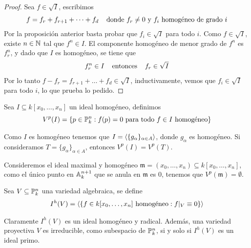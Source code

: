 \documentclass[11pt]{article}
\def \m {\mathfrak{m}}
\begin{document}
\begin{proof}
    Sea $f\in\sqrt{I}$, escribimos
    \begin{equation*}
        f=f_{r}+f_{r+1}+\dots+f_{d}
        \htext{donde}f_{r}\neq0 \text{ y $f_{i}$ homogéneo de grado }i
    \end{equation*}
    Por la proposición anterior basta probar que $f_{i}\in\sqrt{I}$ para todo $i$. Como 
    $f\in\sqrt{I}$, existe $n\in\N$ tal que $f^{n}\in I$. El componente homogéneo de menor grado
    de $f^{n}$ es $f_{r}^{n}$, y dado que $I$ es homogéneo, se tiene que
    \begin{equation*}
        f_{r}^{n}\in I \hhtext{entonces} f_{r}\in\sqrt{I}
    \end{equation*}
    Por lo tanto $f-f_{r}=f_{r+1}+\dots+f_{d}\in\sqrt{I}$, inductivamente, vemos que 
    $f_{i}\in\sqrt{I}$ para todo $i$, lo que prueba lo pedido.
\end{proof}

\begin{dfn}
    Sea $I\subseteq k[x_{0},\dots,x_{n}]$ un ideal homogéneo, definimos
    \begin{equation*}
        V^{p}(I)=\{p\in\P_{k}^{n}:f(p)=0 \text{ para todo } f\in I \text{ homogéneo}\}
    \end{equation*}
\end{dfn}

\obs Como $I$ es homogéneo tenemos que $I=\gen{\{g_{\alpha}\}_{\alpha\in A}}$, donde $g_{\alpha}$ 
es homogéneo. Si consideramos $T=\{g_{\alpha}\}_{\alpha\in A}$, entonces $V^{p}(I)=V^{p}(T)$.

\vspace{1mm}
\noindent Consideremos el ideal maximal y homogéneo 
$\m=(x_{0},\dots,x_{n})\subseteq k[x_{0},\dots,x_{n}]$, como el único punto en $\A_{k}^{n+1}$ que 
se anula en $\m$ es $0$, tenemos que $V^{p}(\m)=\emptyset$.

\begin{dfn}
    Sea $V\subseteq\P_{k}^{n}$ una variedad algebraica, se define
    \begin{equation*}
        I^{h}(V)=\gen{\{f\in k[x_{0},\dots,x_{n}] \text{ homogéneo}:f|_{V}\equiv0\}}
    \end{equation*}
\end{dfn}

\obs Claramente $I^{h}(V)$ es un ideal homogéneo y radical. Además, una variedad proyectiva $V$ es 
irreducible, como subespacio de $\P_{k}^{n}$, si y solo si $I^{h}(V)$ es un ideal primo.
\end{document}

